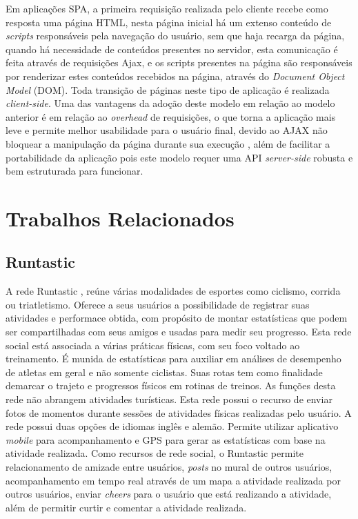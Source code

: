 Em aplicações SPA, a primeira requisição realizada pelo cliente recebe como resposta uma página HTML, nesta página inicial há um extenso conteúdo de
\textit{scripts} responsáveis pela navegação do usuário, sem que haja recarga da página, quando há necessidade de conteúdos presentes no servidor, 
esta comunicação é feita através de requisições Ajax, e os scripts presentes na página são responsáveis por renderizar estes conteúdos recebidos na
página, através do \textit{Document Object Model} (DOM). Toda transição de páginas neste tipo de aplicação é realizada \textit{client-side}. 
Uma das vantagens da adoção deste modelo em relação ao modelo anterior é em relação ao \textit{overhead} de requisições, o que torna a aplicação 
mais leve e permite melhor usabilidade para o usuário final, devido ao AJAX não bloquear a manipulação da página durante sua execução \cite{spa01}, 
além de facilitar a portabilidade da aplicação pois este modelo requer uma API \textit{server-side} robusta e bem estruturada para funcionar.

\section{Trabalhos Relacionados}
\subsection{Runtastic}
A rede Runtastic \cite{runtastic}, reúne várias modalidades de esportes como ciclismo, corrida ou triatletismo. Oferece a seus usuários a
possibilidade de registrar suas atividades e performace obtida, com propósito de montar estatísticas que podem ser compartilhadas com seus amigos e
usadas para medir seu progresso. Esta rede social está associada a várias práticas físicas, com seu foco voltado ao treinamento. É munida de 
estatísticas para auxiliar em análises de desempenho de atletas em geral e não somente ciclistas. Suas rotas tem como finalidade demarcar o trajeto 
e progressos físicos em rotinas de treinos. As funções desta rede não abrangem atividades turísticas. Esta rede possui o recurso de enviar fotos de 
momentos durante sessões de atividades físicas realizadas pelo usuário. A rede  possui duas opções de idiomas inglês e alemão. Permite utilizar 
aplicativo \textit{mobile} para acompanhamento e GPS para gerar as estatísticas com base na atividade realizada. Como recursos de rede social, o 
Runtastic permite relacionamento de amizade entre usuários, \textit{posts} no mural de outros usuários, acompanhamento em tempo real através de um 
mapa a  atividade realizada por outros usuários, enviar \textit{cheers} para o usuário que está realizando a atividade, além de permitir curtir e 
comentar a atividade realizada. 

